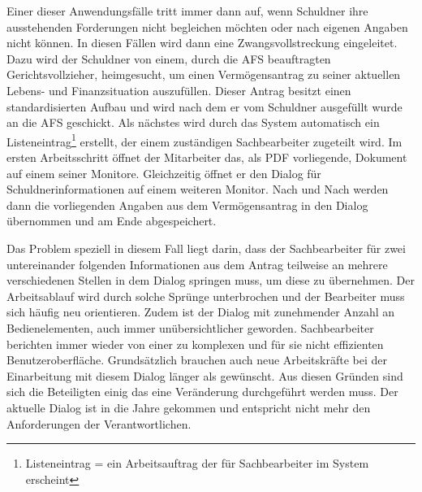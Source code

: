 Einer dieser Anwendungsfälle tritt immer dann auf, wenn Schuldner ihre ausstehenden Forderungen nicht begleichen möchten oder nach eigenen Angaben nicht können. In diesen Fällen wird dann eine Zwangsvollstreckung eingeleitet. Dazu wird der Schuldner von einem, durch die \gls{AFS} beauftragten Gerichtsvollzieher, heimgesucht, um einen Vermögensantrag zu seiner aktuellen Lebens- und Finanzsituation auszufüllen. Dieser Antrag besitzt einen standardisierten Aufbau und wird nach dem er vom Schuldner ausgefüllt wurde an die \gls{AFS} geschickt. Als nächstes wird durch das System automatisch ein Listeneintrag\footnote{Listeneintrag = ein Arbeitsauftrag der für Sachbearbeiter im System erscheint} erstellt, der einem zuständigen Sachbearbeiter zugeteilt wird. Im ersten Arbeitsschritt öffnet der Mitarbeiter das, als PDF vorliegende, Dokument auf einem seiner Monitore. Gleichzeitig öffnet er den Dialog für Schuldnerinformationen auf einem weiteren Monitor. Nach und Nach werden dann die vorliegenden Angaben aus dem Vermögensantrag in den Dialog übernommen und am Ende abgespeichert. 

Das Problem speziell in diesem Fall liegt darin, dass der Sachbearbeiter für zwei untereinander folgenden Informationen aus dem Antrag teilweise an mehrere verschiedenen Stellen in dem Dialog springen muss, um diese zu übernehmen. Der Arbeitsablauf wird durch solche Sprünge unterbrochen und der Bearbeiter muss sich häufig neu orientieren. Zudem ist der Dialog mit zunehmender Anzahl an Bedienelementen, auch immer unübersichtlicher geworden. Sachbearbeiter berichten immer wieder von einer zu komplexen und für sie nicht effizienten Benutzeroberfläche. Grundsätzlich brauchen auch neue Arbeitskräfte bei der Einarbeitung mit diesem Dialog länger als gewünscht. Aus diesen Gründen sind sich die Beteiligten einig das eine Veränderung durchgeführt werden muss. Der aktuelle Dialog ist in die Jahre gekommen und entspricht nicht mehr den Anforderungen der Verantwortlichen.



